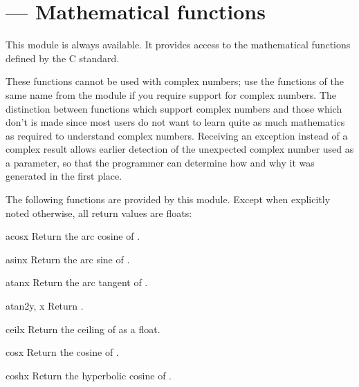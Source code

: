 \section{ ---
         Mathematical functions}


This module is always available.  It provides access to the
mathematical functions defined by the C standard.

These functions cannot be used with complex numbers; use the functions
of the same name from the  module if you require
support for complex numbers.  The distinction between functions which
support complex numbers and those which don't is made since most users
do not want to learn quite as much mathematics as required to
understand complex numbers.  Receiving an exception instead of a
complex result allows earlier detection of the unexpected complex
number used as a parameter, so that the programmer can determine how
and why it was generated in the first place.

The following functions are provided by this module.  Except
when explicitly noted otherwise, all return values are floats:

\begin{funcdesc}{acos}{x}
Return the arc cosine of .
\end{funcdesc}

\begin{funcdesc}{asin}{x}
Return the arc sine of .
\end{funcdesc}

\begin{funcdesc}{atan}{x}
Return the arc tangent of .
\end{funcdesc}

\begin{funcdesc}{atan2}{y, x}
Return .
\end{funcdesc}

\begin{funcdesc}{ceil}{x}
Return the ceiling of  as a float.
\end{funcdesc}

\begin{funcdesc}{cos}{x}
Return the cosine of .
\end{funcdesc}

\begin{funcdesc}{cosh}{x}
Return the hyperbolic cosine of .
\end{funcdesc}

